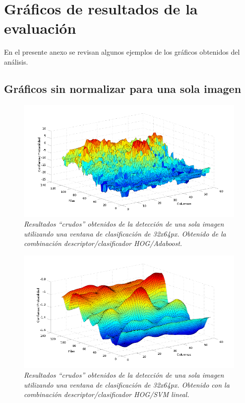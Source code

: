 \chapter{Gráficos de resultados de la evaluación}
\label{cap:gre}

En el presente anexo se revisan algunos ejemplos de los gráficos obtenidos del análisis.

\section{Gráficos sin normalizar para una sola imagen}

\begin{figure}[H]
  \centering
  \includegraphics[scale=.6]{images/raw/boost/prueba2}
  \caption{\em  Resultados ``crudos'' obtenidos de la detección de una sola imagen utilizando una ventana de clasificación de 32x64px. Obtenido de la combinación descriptor/clasificador HOG/Adaboost.}  
  \label{fig:gsn1}
\end{figure}

\begin{figure}[H]
  \centering
  \includegraphics[scale=.6]{images/raw/svm/prueba2}
  \caption{\em  Resultados ``crudos'' obtenidos de la detección de una sola imagen utilizando una ventana de clasificación de 32x64px. Obtenido con la combinación descriptor/clasificador HOG/SVM lineal.}  
  \label{fig:gsn2}
\end{figure}

